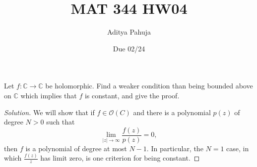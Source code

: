 \documentclass[10pt]{article}
\title{MAT 344 HW04}
\author{\large Aditya Pahuja}
\date{\large Due 02/24}
\newcommand{\dd}{\mathrm{d}}
\providecommand{\CC}{\mathbb C}
\newenvironment{soln}{\begin{proof}[Solution]}{\end{proof}}
\providecommand{\abs}[1]{\left\lvert #1\right\rvert}
\begin{document}
\maketitle

\begin{problem}
    Let $f\colon\CC\to\CC$ be holomorphic.
    Find a weaker condition than being bounded above on $\CC$
    which implies that $f$ is constant, and give the proof.
\end{problem}

\begin{soln}
    We will show that if $f\in\mathcal O(C)$
    and there is a polynomial $p(z)$ of degree $N>0$ such that
    \begin{equation*}
	\lim_{\abs z\to\infty} \frac{f(z)}{p(z)} = 0,
    \end{equation*}
    then $f$ is a polynomial of degree at most $N-1$.
    In particular, the $N=1$ case, in which $\frac{f(z)}{z}$ has limit zero,
    is one criterion for being constant.


\end{soln}
\end{document}
